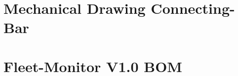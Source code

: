 \section{Mechanical Drawing Connecting-Bar}
\enlargethispage{2.5cm}
\begin{adjustwidth}{0.23cm}{0cm} \hfuzz=7.0pt \vfuzz=20.0pt
\end{adjustwidth}
\newpage








\iffalse


\section{Fleet-Monitor V1.0 BOM} \label{Fleet-Monitor V1.0 BOM}
\enlargethispage{1.6cm}
\begin{adjustwidth}{-0.23cm}{0cm} \hfuzz=7.0pt \vfuzz=20.0pt
\end{adjustwidth}
\newpage


